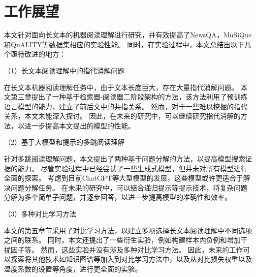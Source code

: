 \section{工作展望}
本文针对面向长文本的机器阅读理解进行研究，并有效提高了NewsQA，MuSiQue和QuALITY等数据集相应的实验性能。
同时，在实验过程中，本文总结出以下几个亟待改进的地方：

（1）长文本阅读理解中的指代消解问题

在长文本机器阅读理解任务中，由于文本长度巨大，存在大量指代消解问题。
本文第三章提出了一种基于检索器-阅读器二阶段架构的方法，该方法利用了预训练语言模型的能力，建立了前后文中的共指关系。
然而，对于一些难以挖掘的指代关系，本文未能深入探讨。
因此，在未来的研究中，可以继续研究指代消解的方法，以进一步提高本文提出的模型的性能。

（2）基于大模型和提示的多跳阅读理解

针对多跳阅读理解问题，本文提出了两种基于问题分解的方法，以提高模型搜索证据的能力。
尽管实验过程中已经尝试了一些生成式模型，但并未对所有模型进行全面的探索。
考虑到目前ChatGPT等大型模型的发展，这些模型或许更适合于解决问题分解任务。
在未来的研究中，可以结合递归提示等提示技术，将复杂问题分解为多个简单子问题，并逐步回答，以进一步提高模型的准确性和效率。

（3）多种对比学习方法

本文的第五章节采用了对比学习方法，以建立多项选择长文本阅读理解中不同选项之间的联系。
同时，本文还提出了一些衍生实验，例如构建样本内负例和增加干扰因子等。
然而，这些实验并没有涉及多种对比学习方法。
因此，未来的工作可以探索将其他技术如知识图谱等加入到对比学习方法中，以及从对比损失权重以及温度系数的设置等角度，进行更全面的实验。

